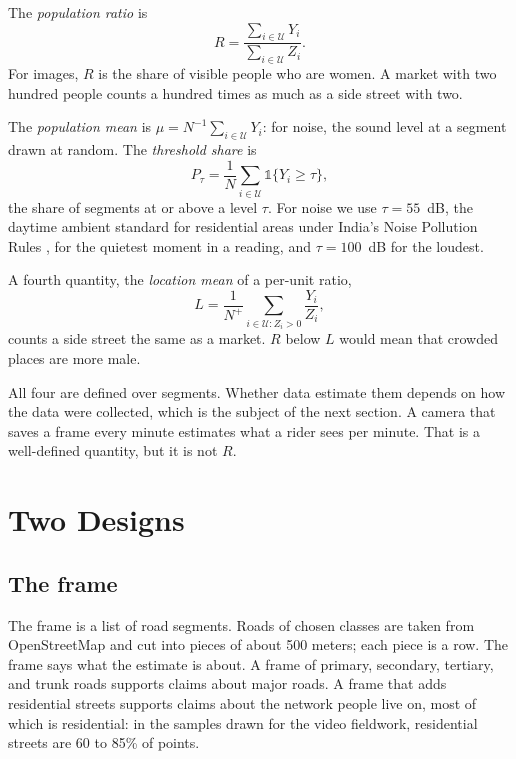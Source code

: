 \documentclass[11pt]{article}
\newcommand{\ind}{\mathbb{1}}
\newcommand{\Npop}{N}
\newcommand{\universe}{\mathcal{U}}
\begin{document}
The \emph{population ratio} is
\begin{equation}
    R = \frac{\sum_{i \in \universe} Y_i}{\sum_{i \in \universe} Z_i}.
\end{equation}
For images, $R$ is the share of visible people who are women. A market with two hundred people counts a hundred times as much as a side street with two.

The \emph{population mean} is $\mu = \Npop^{-1} \sum_{i \in \universe} Y_i$: for noise, the sound level at a segment drawn at random. The \emph{threshold share} is
\begin{equation}
    P_\tau = \frac{1}{\Npop} \sum_{i \in \universe} \ind\{Y_i \geq \tau\},
\end{equation}
the share of segments at or above a level $\tau$. For noise we use $\tau = 55$~dB, the daytime ambient standard for residential areas under India's Noise Pollution Rules \citep{indiaNoiseRules2000}, for the quietest moment in a reading, and $\tau = 100$~dB for the loudest.

A fourth quantity, the \emph{location mean} of a per-unit ratio,
\begin{equation}
    L = \frac{1}{\Npop^+} \sum_{i \in \universe: Z_i > 0} \frac{Y_i}{Z_i},
\end{equation}
counts a side street the same as a market. $R$ below $L$ would mean that crowded places are more male.

All four are defined over segments. Whether data estimate them depends on how the data were collected, which is the subject of the next section. A camera that saves a frame every minute estimates what a rider sees per minute. That is a well-defined quantity, but it is not $R$.

\section{Two Designs}
\label{sec:designs}

\subsection{The frame}

The frame is a list of road segments. Roads of chosen classes are taken from OpenStreetMap and cut into pieces of about 500 meters; each piece is a row. The frame says what the estimate is about. A frame of primary, secondary, tertiary, and trunk roads supports claims about major roads. A frame that adds residential streets supports claims about the network people live on, most of which is residential: in the samples drawn for the video fieldwork, residential streets are 60 to 85\% of points.
\end{document}
